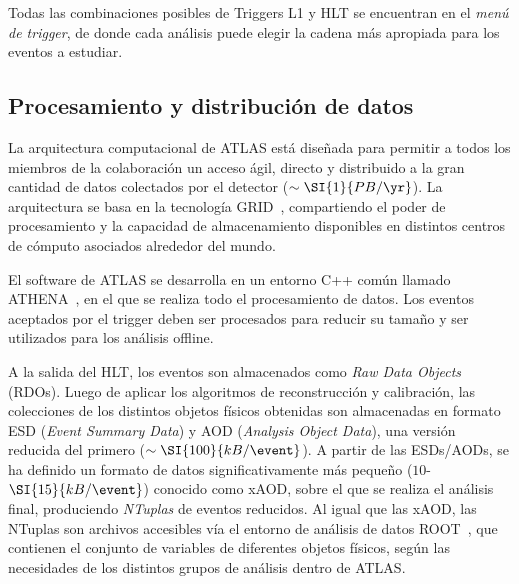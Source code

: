 Todas las combinaciones posibles de Triggers L1 y HLT se encuentran en el \textit{menú de trigger}, de donde cada análisis puede elegir la cadena más apropiada para los eventos a estudiar.



\subsection{Procesamiento y distribución de datos} \label{sec:ch2:processing}

La arquitectura computacional de ATLAS está diseñada para permitir a todos los miembros de la colaboración un acceso ágil, directo y distribuido a la gran cantidad de datos colectados por el detector ($\sim\SI{1}{PB/\yr}$). La arquitectura se basa en la tecnología GRID~\cite{CERN}, compartiendo el poder de procesamiento y la capacidad de almacenamiento disponibles en distintos centros de cómputo asociados alrededor del mundo.

El software de ATLAS se desarrolla en un entorno C++ común llamado ATHENA~\cite{Duckeck:2005rb,Lenzi:1214931, Calafiura:865624}, en el que se realiza todo el procesamiento de datos. Los eventos aceptados por el trigger deben ser procesados para reducir su tamaño y ser utilizados para los análisis offline.

A la salida del HLT, los eventos son almacenados como \textit{Raw Data Objects} (RDOs). Luego de aplicar los algoritmos de reconstrucción y calibración, las colecciones de los distintos objetos físicos obtenidas son almacenadas en formato ESD (\textit{Event Summary Data}) y AOD (\textit{Analysis Object Data}), una versión reducida del primero ($\sim\SI{100}{kB/\event}$). A partir de las ESDs/AODs, se ha definido un formato de datos significativamente más pequeño ($10$-$\SI{15}{kB/\event}$) conocido como xAOD, sobre el que se realiza el análisis final, produciendo \textit{NTuplas} de eventos reducidos. Al igual que las xAOD, las NTuplas son archivos accesibles vía el entorno de análisis de datos ROOT~\cite{Brun1997}, que contienen el conjunto de variables de diferentes objetos físicos, según las necesidades de los distintos grupos de análisis dentro de ATLAS.

